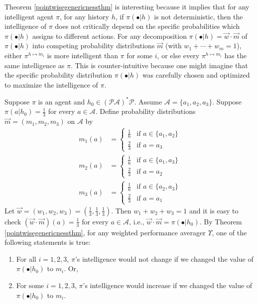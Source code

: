 \documentclass[runningheads]{llncs}
\begin{document}
Theorem \ref{pointwisegenericnessthm} is interesting because it implies that for
any intelligent agent $\pi$, for any history $h$, if $\pi(\bullet|h)$ is not deterministic,
then the intelligence of $\pi$ does not critically depend on the specific probabilities
which $\pi(\bullet|h)$ assigns to different actions. For any decomposition
$\pi(\bullet|h)=\vec w\cdot\vec m$ of $\pi(\bullet|h)$ into competing probability
distributions $\vec m$
(with $w_1+\cdots+w_m=1$), either $\pi^{h\mapsto m_i}$ is more intelligent
than $\pi$ for some $i$, or else every $\pi^{h\mapsto m_i}$ has the same intelligence as
$\pi$. This is counter-intuitive because one might imagine that the specific probability
distribution $\pi(\bullet|h)$ was carefully chosen and optimized to maximize the intelligence
of $\pi$.

\begin{example}
\label{genericnessexample}
    Suppose $\pi$ is an agent and $h_0\in(\mathcal P\mathcal A)^*\mathcal P$.
    Assume $\mathcal A=\{a_1,a_2,a_3\}$.
    Suppose $\pi(a|h_0)=\frac13$ for every $a\in\mathcal A$.
    Define probability distributions $\vec m=(m_1,m_2,m_3)$ on $\mathcal A$ by
    \begin{align*}
        m_1(a) &=
        \begin{cases}
            \frac16 &\mbox{if $a\in\{a_1,a_2\}$}\\
            \frac23 &\mbox{if $a=a_3$}
        \end{cases}\\
        m_2(a) &=
        \begin{cases}
            \frac16 &\mbox{if $a\in\{a_1,a_3\}$}\\
            \frac23 &\mbox{if $a=a_2$}
        \end{cases}\\
        m_3(a) &=
        \begin{cases}
            \frac16 &\mbox{if $a\in\{a_2,a_3\}$}\\
            \frac23 &\mbox{if $a=a_1$}
        \end{cases}
    \end{align*}
    Let $\vec w=(w_1,w_2,w_3)=(\frac13,\frac13,\frac13)$. Then $w_1+w_2+w_3=1$ and
    it is easy to check
    $(\vec w\cdot\vec m)(a)=\frac13$ for every $a\in\mathcal A$,
    i.e., $\vec w\cdot\vec m=\pi(\bullet|h_0)$.
    By Theorem \ref{pointwisegenericnessthm},
    for any weighted performance averager $\Upsilon$,
    one of the following statements is true:
    \begin{enumerate}
        \item
        For all $i=1,2,3$, $\pi$'s intelligence would not change if we
        changed the value of $\pi(\bullet|h_0)$ to $m_i$. Or,
        \item
        For some $i=1,2,3$, $\pi$'s intelligence would increase if
        we changed the value of $\pi(\bullet|h_0)$ to $m_i$.
    \end{enumerate}
\end{example}
\end{document}

